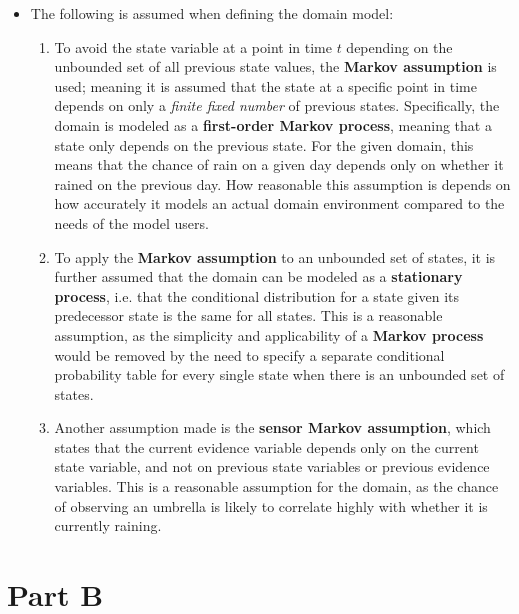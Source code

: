 \begin{itemize}
\item The following is assumed when defining the domain model:
\begin{enumerate}
\item To avoid the state variable at a point in time $t$ depending on the unbounded set of all previous state values, the \textbf{Markov assumption} is used; meaning it is assumed that the state at a specific point in time depends on only a \textit{finite fixed number} of previous states. Specifically, the domain is modeled as a \textbf{first-order Markov process}, meaning that a state only depends on the previous state. For the given domain, this means that the chance of rain on a given day depends only on whether it rained on the previous day. How reasonable this assumption is depends on how accurately it models an actual domain environment compared to the needs of the model users.
\item To apply the \textbf{Markov assumption} to an unbounded set of states, it is further assumed that the domain can be modeled as a \textbf{stationary process}, i.e. that the conditional distribution for a state given its predecessor state is the same for all states. This is a reasonable assumption, as the simplicity and applicability of a \textbf{Markov process} would be removed by the need to specify a separate conditional probability table for every single state when there is an unbounded set of states.
\item Another assumption made is the \textbf{sensor Markov assumption}, which states that the current evidence variable depends only on the current state variable, and not on previous state variables or previous evidence variables. This is a reasonable assumption for the domain, as the chance of observing an umbrella is likely to correlate highly with whether it is currently raining.
\end{enumerate}
\end{itemize}

\newpage

\section*{Part B}

